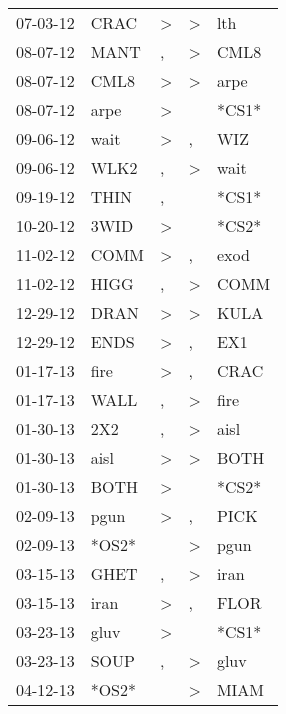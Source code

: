 \begin{supertabular}{lllll}
 07-03-12 &   CRAC &     \textgreater &     \textgreater &    lth \\
 08-07-12 &   MANT &                , &     \textgreater &   CML8 \\
 08-07-12 &   CML8 &     \textgreater &     \textgreater &   arpe \\
 08-07-12 &   arpe &     \textgreater &                  &  *CS1* \\
 09-06-12 &   wait &     \textgreater &                , &    WIZ \\
 09-06-12 &   WLK2 &                , &     \textgreater &   wait \\
 09-19-12 &   THIN &                , &                  &  *CS1* \\
 10-20-12 &   3WID &     \textgreater &                  &  *CS2* \\
 11-02-12 &   COMM &     \textgreater &                , &   exod \\
 11-02-12 &   HIGG &                , &     \textgreater &   COMM \\
 12-29-12 &   DRAN &     \textgreater &     \textgreater &   KULA \\
 12-29-12 &   ENDS &     \textgreater &                , &    EX1 \\
 01-17-13 &   fire &     \textgreater &                , &   CRAC \\
 01-17-13 &   WALL &                , &     \textgreater &   fire \\
 01-30-13 &    2X2 &                , &     \textgreater &   aisl \\
 01-30-13 &   aisl &     \textgreater &     \textgreater &   BOTH \\
 01-30-13 &   BOTH &     \textgreater &                  &  *CS2* \\
 02-09-13 &   pgun &     \textgreater &                , &   PICK \\
 02-09-13 &  *OS2* &                  &     \textgreater &   pgun \\
 03-15-13 &   GHET &                , &     \textgreater &   iran \\
 03-15-13 &   iran &     \textgreater &                , &   FLOR \\
 03-23-13 &   gluv &     \textgreater &                  &  *CS1* \\
 03-23-13 &   SOUP &                , &     \textgreater &   gluv \\
 04-12-13 &  *OS2* &                  &     \textgreater &   MIAM \\

\end{supertabular}
